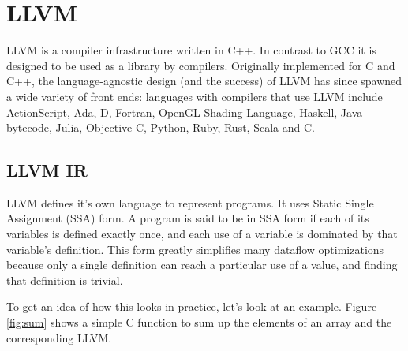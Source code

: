 \documentclass[a4paper,bibliography=totocnumbered,parskip,headsepline]{scrbook}
\begin{document}
\section{LLVM}
LLVM\cite{lattner2002llvm} is a compiler infrastructure written in C++.
In contrast to GCC it is designed to be used as a library by compilers.
Originally implemented for C and C++, the language-agnostic design (and the success) of LLVM has since spawned a wide variety of front ends: languages with compilers that use LLVM include ActionScript, Ada, D, Fortran, OpenGL Shading Language, Haskell, Java bytecode, Julia, Objective-C, Python, Ruby, Rust, Scala and C.

\subsection{LLVM IR}
LLVM defines it's own language to represent programs.
It uses Static Single Assignment (SSA) form.\cite{alpern1988detecting,rosen1988global}
A program is said to be in SSA form if each of its variables is defined exactly once, and each use of a variable is dominated by that variable’s definition.
This form greatly simplifies many dataflow optimizations because only a single definition can reach a particular use of a value, and finding that definition is trivial.

To get an idea of how this looks in practice, let's look at an example.
Figure \ref{fig:sum} shows a simple C function to sum up the elements of an array and the corresponding LLVM.
\end{document}
